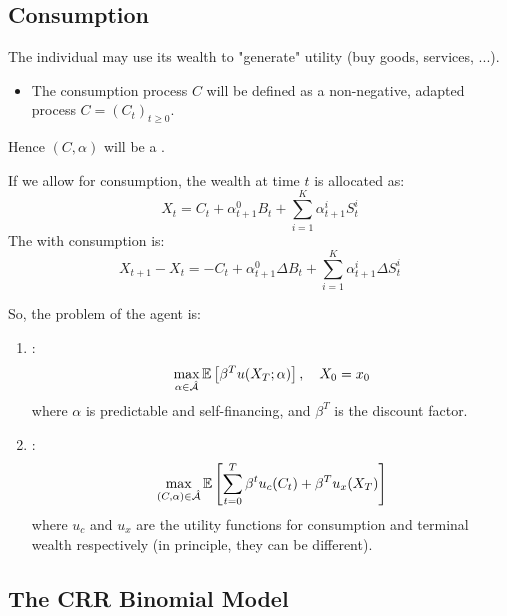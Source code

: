 \subsection{Consumption}

The individual may use its wealth to "generate" utility (buy goods, services, ...).
\begin{itemize}
    \item The consumption process $C$ will be defined as a non-negative, adapted process $C = (C_t)_{t \geq 0}$.
\end{itemize}

Hence $(C, \alpha)$ will be a .

If we allow for consumption, the wealth at time $t$ is allocated as:
\begin{equation}
    X_t = C_t + \alpha_{t+1}^0 B_t + \sum_{i=1}^K \alpha_{t+1}^i S_t^i
\end{equation}
The  with consumption is:
\begin{equation}
    X_{t+1} - X_t = -C_t + \alpha_{t+1}^0 \Delta B_t + \sum_{i=1}^K \alpha_{t+1}^i \Delta S_t^i
\end{equation}

So, the problem of the agent is:
\begin{enumerate}
    \item {}:
    \begin{equation}
        \max_{\alpha \in \hat{\mathcal{A}}} \mathbb E \left[ \beta^T u(X_T; \alpha) \right], \quad X_0 = x_0
    \end{equation}
    where $\alpha$ is predictable and self-financing, and $\beta^T$ is the discount factor.
    
    \item {}:
    \begin{equation}
        \max_{(C, \alpha) \in \hat{\mathcal{A}}} \mathbb E \left[ \sum_{t=0}^T \beta^t u_c(C_t) + \beta^T u_x(X_T) \right]
    \end{equation}
    where $u_c$ and $u_x$ are the utility functions for consumption and terminal wealth respectively (in principle, they can be different).
\end{enumerate}

\subsection{The CRR Binomial Model}

